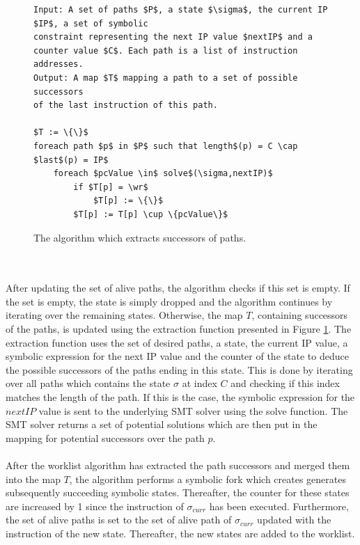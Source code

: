 \documentclass{kththesis}
\begin{document}
\begin{figure}[!t]
    \centering
\begin{algorithmFrame}
\begin{lstlisting}[style=algorithm]
Input: A set of paths $P$, a state $\sigma$, the current IP $IP$, a set of symbolic
constraint representing the next IP value $nextIP$ and a 
counter value $C$. Each path is a list of instruction addresses. 
Output: A map $T$ mapping a path to a set of possible successors 
of the last instruction of this path.

$T := \{\}$
foreach path $p$ in $P$ such that length$(p) = C \cap $last$(p) = IP$
    foreach $pcValue \in$ solve$(\sigma,nextIP)$
        if $T[p] = \wr$
            $T[p] := \{\}$    
        $T[p] := T[p] \cup \{pcValue\}$

\end{lstlisting}
\end{algorithmFrame}
\caption[The algorithm which extracts successors of paths.]{The algorithm which extracts successors of paths.}
    \label{fig:DSEextract}
\end{figure}
\\ \\
After updating the set of alive paths, the algorithm checks if this set is empty. If the set is empty, the state is simply dropped and the algorithm continues by iterating over the remaining states. Otherwise, the map $T$, containing successors of the paths, is updated using the extraction function presented in Figure \ref{fig:DSEextract}. The extraction function uses the set of desired paths, a state, the current IP value, a symbolic expression for the next IP value and the counter of the state to deduce the possible successors of the paths ending in this state. This is done by iterating over all paths which contains the state $\sigma$ at index $C$ and checking if this index matches the length of the path. If this is the case, the symbolic expression for the $nextIP$ value is sent to the underlying SMT solver using the solve function. The SMT solver returns a set of potential solutions which are then put in the mapping for potential successors over the path $p$.
\\ \\
After the worklist algorithm has extracted the path successors and merged them into the map $T$, the algorithm performs a symbolic fork which creates generates subsequently succeeding symbolic states. Thereafter, the counter for these states are increased by 1 since the instruction of $\sigma_{curr}$ has been executed. Furthermore, the set of alive paths is set to the set of alive path of $\sigma_{curr}$ updated with the instruction of the new state. Thereafter, the new states are added to the worklist.
\end{document}
